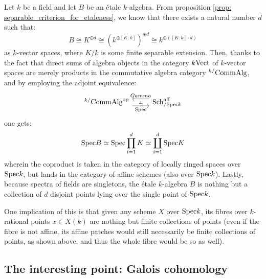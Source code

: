             \begin{remark} \label{remark: fibres_of_etale_maps_over_points}
                Let $k$ be a field and let $B$ be an \'etale $k$-algebra. From proposition \ref{prop: separable_criterion_for_etaleness}, we know that there exists a natural number $d$ such that:
                    $$B \cong K^{\oplus d} \cong (k^{\oplus [K : k]})^{\oplus d} \cong k^{\oplus ([K : k] \cdot d)}$$
                as $k$-vector spaces, where $K/k$ is some finite separable extension. Then, thanks to the fact that direct sums of algebra objects in the category $k\mathrm{Vect}$ of $k$-vector spaces are merely products in the commutative algebra category ${}^{k/}\mathrm{Comm}\mathrm{Alg}$, and by employing the adjoint equivalence:
                    $$
                        \begin{tikzcd}
                        	{{}^{k/}\Comm\Alg^{\op}} & {\Sch^{\aff}_{/\Spec k}}
                        	\arrow[""{name=0, anchor=center, inner sep=0}, "\Spec"', shift right=2, from=1-1, to=1-2]
                        	\arrow[""{name=1, anchor=center, inner sep=0}, "Gamma"', shift right=2, from=1-2, to=1-1]
                        	\arrow["\dashv"{anchor=center, rotate=-90}, draw=none, from=1, to=0]
                        \end{tikzcd}
                    $$
                one gets:
                    $$\mathrm{Spec} B \simeq \mathrm{Spec} \prod_{i = 1}^d K \simeq \coprod_{i = 1}^d \mathrm{Spec} K$$
                wherein the coproduct is taken in the category of locally ringed spaces over $\mathrm{Spec} k$, but lands in the category of affine schemes (also over $\mathrm{Spec} k$). Lastly, because spectra of fields are singletons, the \'etale $k$-algebra $B$ is nothing but a collection of $d$ disjoint points lying over the single point of $\mathrm{Spec} k$. 
                
                One implication of this is that given any scheme $X$ over $\mathrm{Spec} k$, its fibres over $k$-rational points $x \in X(k)$ are nothing but finite collections of points (even if the fibre is not affine, its affine patches would still necessarily be finite collections of points, as shown above, and thus the whole fibre would be so as well).
            \end{remark}
    
        \subsection{The interesting point: Galois cohomology}
